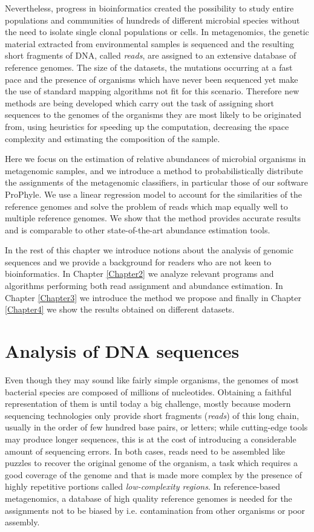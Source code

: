 Nevertheless, progress in bioinformatics created the possibility to study entire populations and communities of hundreds of different microbial species without the need to isolate single clonal populations or cells. In metagenomics, the genetic material extracted from environmental samples is sequenced and the resulting short fragments of DNA, called \textit{reads}, are assigned to an extensive database of reference genomes. The size of the datasets, the mutations occurring at a fast pace and the presence of organisms which have never been sequenced yet make the use of standard mapping algorithms not fit for this scenario. Therefore new methods are being developed which carry out the task of assigning short sequences to the genomes of the organisms they are most likely to be originated from, using heuristics for speeding up the computation, decreasing the space complexity and estimating the composition of the sample.

Here we focus on the estimation of relative abundances of microbial organisms in metagenomic samples, and we introduce a method to probabilistically distribute the assignments of the metagenomic classifiers, in particular those of our software ProPhyle. We use a linear regression model to account for the similarities of the reference genomes and solve the problem of reads which map equally well to multiple reference genomes. We show that the method provides accurate results and is comparable to other state-of-the-art abundance estimation tools.

In the rest of this chapter we introduce notions about the analysis of genomic sequences and we provide a background for readers who are not keen to bioinformatics. In Chapter \ref{Chapter2} we analyze relevant programs and algorithms performing both read assignment and abundance estimation. In Chapter \ref{Chapter3} we introduce the method we propose and finally in Chapter \ref{Chapter4} we show the results obtained on different datasets.

\section{Analysis of DNA sequences}

Even though they may sound like fairly simple organisms, the genomes of most bacterial species are composed of millions of nucleotides. Obtaining a faithful representation of them is until today a big challenge, mostly because modern sequencing technologies only provide short fragments (\textit{reads}) of this long chain, usually in the order of few hundred base pairs, or letters; while cutting-edge tools may produce longer sequences, this is at the cost of introducing a considerable amount of sequencing errors. In both cases, reads need to be assembled like puzzles to recover the original genome of the organism, a task which requires a good coverage of the genome and that is made more complex by the presence of highly repetitive portions called \textit{low-complexity regions}. In reference-based metagenomics, a database of high quality reference genomes is needed for the assignments not to be biased by i.e. contamination from other organisms or poor assembly.

